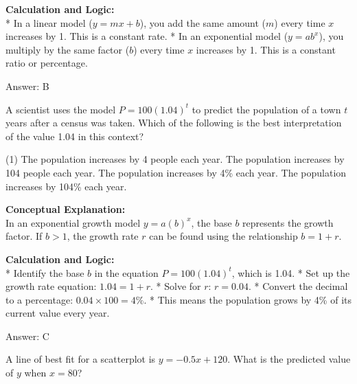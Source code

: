 \documentclass[11pt,paper=a4,answers]{exam}
\begin{document}
\begin{questions}
\begin{solution}
\vspace{30pt}

\textbf{Calculation and Logic:} \\
* In a linear model ($y = mx + b$), you add the same amount ($m$) every time $x$ increases by 1. This is a constant rate.
* In an exponential model ($y = ab^x$), you multiply by the same factor ($b$) every time $x$ increases by 1. This is a constant ratio or percentage.

\vspace{30pt}

Answer: \colorbox{yellow!100}{B}
\end{solution}

\question
A scientist uses the model $P = 100(1.04)^t$ to predict the population of a town $t$ years after a census was taken. Which of the following is the best interpretation of the value 1.04 in this context?
\begin{tasks}(1)
    \task The population increases by 4 people each year.
    \task The population increases by 104 people each year.
    \task The population increases by 4\% each year.
    \task The population increases by 104\% each year.
\end{tasks}

\begin{solution}
\textbf{Conceptual Explanation:} \\
In an exponential growth model $y = a(b)^x$, the base $b$ represents the growth factor. If $b > 1$, the growth rate $r$ can be found using the relationship $b = 1 + r$.

\vspace{30pt}

\textbf{Calculation and Logic:} \\
* Identify the base $b$ in the equation $P = 100(1.04)^t$, which is 1.04.
* Set up the growth rate equation: $1.04 = 1 + r$.
* Solve for $r$: $r = 0.04$.
* Convert the decimal to a percentage: $0.04 \times 100 = 4\%$.
* This means the population grows by 4\% of its current value every year.

\vspace{30pt}

Answer: \colorbox{yellow!100}{C}
\end{solution}

\vspace{60pt}

\question
A line of best fit for a scatterplot is $y = -0.5x + 120$. What is the predicted value of $y$ when $x = 80$?


\end{questions}
\end{document}
